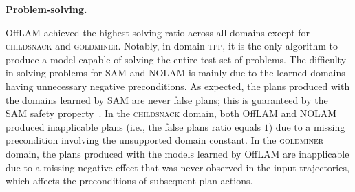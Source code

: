 \documentclass[letterpaper]{article} %
\newcommand{\nolam}{NOLAM\xspace}
\newcommand{\offlam}{OffLAM\xspace}
\newcommand{\samshort}{SAM\xspace}
\newcommand{\miniparagraph}[1]{\textbf{#1.}}
\newif\ifaddcomments
\newcommand{\roni}[1]{\ifaddcomments{\textcolor{red}{[Roni: #1]}}\fi}
\newcommand{\leo}[1]{\ifaddcomments{\textcolor{pink}{[Leonardo: #1]}}\fi}
\begin{document}
\miniparagraph{Problem-solving}  
%

%
\offlam{} achieved the highest solving ratio across all domains except for \textsc{childsnack} and \textsc{goldminer}. Notably, in domain \textsc{tpp}, it is the only algorithm to produce a model capable of solving the entire test set of problems.
The difficulty in solving problems for \samshort{} and \nolam{} is mainly due to the learned domains having unnecessary negative preconditions. 
%
As expected, the plans produced with the domains learned by \samshort are never false plans; this is guaranteed by the \samshort safety property~\cite{juba2021safe}. 
In the \textsc{childsnack} domain, both \offlam and \nolam produced inapplicable plans (i.e., the false plans ratio equals $1$) due to a missing precondition involving the unsupported domain constant.
In the \textsc{goldminer} domain, the plans produced with the models learned by \offlam{} are inapplicable due to a missing negative effect that was never observed in the input trajectories, which affects the preconditions of subsequent plan actions.
\end{document}
